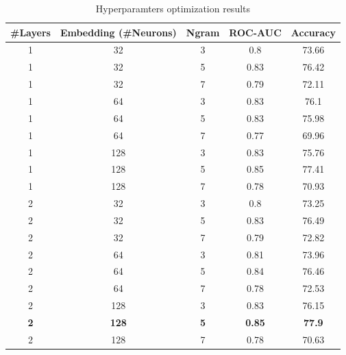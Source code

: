 \documentclass[conference]{IEEEtran}
\begin{document}
\begin{table}[!htbp]
	\centering
	\begin{tabular}{||c c c c c||} 
		\#Layers & Embedding (\#Neurons) & Ngram & ROC-AUC & Accuracy \\ [0.5ex] 
		\hline\hline
		1      & 32                      & 3     & 0.8     & 73.66    \\
		1      & 32                      & 5     & 0.83    & 76.42    \\
		1      & 32                      & 7     & 0.79    & 72.11    \\
		1      & 64                      & 3     & 0.83    & 76.1     \\
		1      & 64                      & 5     & 0.83    & 75.98    \\
		1      & 64                      & 7     & 0.77    & 69.96    \\
		1      & 128                     & 3     & 0.83    & 75.76    \\
		1      & 128                     & 5     & 0.85    & 77.41    \\
		1      & 128                     & 7     & 0.78    & 70.93    \\
		2      & 32                      & 3     & 0.8     & 73.25    \\
		2      & 32                      & 5     & 0.83    & 76.49    \\
		2      & 32                      & 7     & 0.79    & 72.82    \\
		2      & 64                      & 3     & 0.81    & 73.96    \\
		2      & 64                      & 5     & 0.84    & 76.46    \\
		2      & 64                      & 7     & 0.78    & 72.53    \\
		2      & 128                     & 3     & 0.83    & 76.15    \\
		\textbf{2} & \textbf{128}            & \textbf{5} & \textbf{0.85} & \textbf{77.9} \\
		2      & 128                     & 7     & 0.78    & 70.63    \\[1ex]
	\end{tabular}
	\caption{Hyperparamters optimization results}
	\label{table:hyper_results}
\end{table}
\end{document}
